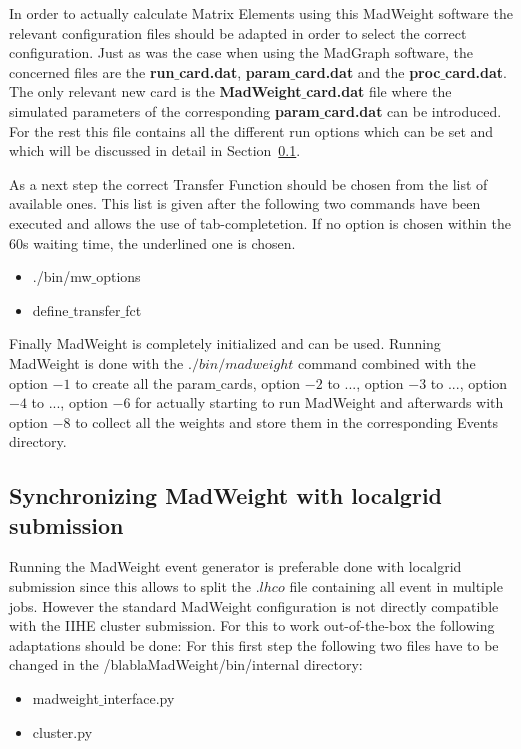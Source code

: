 In order to actually calculate Matrix Elements using this MadWeight software the relevant configuration files should be adapted in order to select the correct configuration. Just as was the case when using the MadGraph software, the concerned files are the \textbf{run$\_$card.dat}, \textbf{param$\_$card.dat} and the \textbf{proc$\_$card.dat}.\\
The only relevant new card is the \textbf{MadWeight$\_$card.dat} file where the simulated parameters of the corresponding \textbf{param$\_$card.dat} can be introduced. For the rest this file contains all the different run options which can be set and which will be discussed in detail in Section~\ref{sec::MWOptions}.

As a next step the correct Transfer Function should be chosen from the list of available ones. This list is given after the following two commands have been executed and allows the use of tab-completetion. If no option is chosen within the 60s waiting time, the underlined one is chosen.
\begin{itemize}
 \item ./bin/mw$\_$options
 \item define$\_$transfer$\_$fct
\end{itemize}

Finally MadWeight is completely initialized and can be used. Running MadWeight is done with the $./bin/madweight$ command combined with the option $-1$ to create all the param$\_$cards, option $-2$ to ..., option $-3$ to ..., option $-4$ to ..., option $-6$ for actually starting to run MadWeight and afterwards with option $-8$ to collect all the weights and store them in the corresponding Events directory.

\subsection{Synchronizing MadWeight with localgrid submission}\label{sec::MWOptions}

Running the MadWeight event generator is preferable done with localgrid submission since this allows to split the $.lhco$ file containing all event in multiple jobs. However the standard MadWeight configuration is not directly compatible with the IIHE cluster submission. For this to work out-of-the-box the following adaptations should be done:
For this first step the following two files have to be changed in the /blablaMadWeight/bin/internal directory:
\begin{itemize}
  \item madweight$\_$interface.py
  \item cluster.py
\end{itemize}

